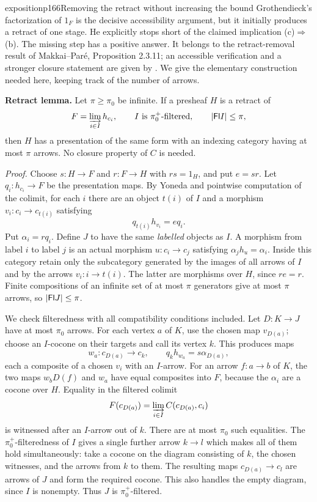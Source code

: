 \begin{dcomment}{exposition}{p166}{Removing the retract without increasing the bound}
Grothendieck's factorization of $1_F$ is the decisive accessibility argument, but it initially produces a retract of one stage. He explicitly stops short of the claimed implication (c)$\Rightarrow$(b). The missing step has a positive answer. It belongs to the retract-removal result of Makkai--Par\'e, Proposition 2.3.11; an accessible verification and a stronger closure statement are given by \citet[Corollaries 4.13 and 4.15, including footnote 2]{Chen2021Sifted}. We give the elementary construction needed here, keeping track of the number of arrows.

\textbf{Retract lemma.} Let $\pi\geq\pi_0$ be infinite. If a presheaf $H$ is a retract of
\[
 F=\varinjlim_{i\in I}h_{c_i},
 \qquad I\text{ is }\pi_0^+\text{-filtered},\qquad |\mathsf{Fl} I|\leq\pi,
\]
then $H$ has a presentation of the same form with an indexing category having at most $\pi$ arrows. No closure property of $C$ is needed.

\textit{Proof.} Choose $s:H\to F$ and $r:F\to H$ with $rs=1_H$, and put $e=sr$. Let $q_i:h_{c_i}\to F$ be the presentation maps. By Yoneda and pointwise computation of the colimit, for each $i$ there are an object $t(i)$ of $I$ and a morphism $v_i:c_i\to c_{t(i)}$ satisfying
\[
 q_{t(i)}h_{v_i}=e q_i.
\]
Put $\alpha_i=rq_i$. Define $J$ to have the same \emph{labelled} objects as $I$. A morphism from label $i$ to label $j$ is an actual morphism $u:c_i\to c_j$ satisfying $\alpha_jh_u=\alpha_i$. Inside this category retain only the subcategory generated by the images of all arrows of $I$ and by the arrows $v_i:i\to t(i)$. The latter are morphisms over $H$, since $re=r$. Finite compositions of an infinite set of at most $\pi$ generators give at most $\pi$ arrows, so $|\mathsf{Fl} J|\leq\pi$.

We check filteredness with all compatibility conditions included. Let $D:K\to J$ have at most $\pi_0$ arrows. For each vertex $a$ of $K$, use the chosen map $v_{D(a)}$; choose an $I$-cocone on their targets and call its vertex $k$. This produces maps
\[
 w_a:c_{D(a)}\longrightarrow c_k,
 \qquad q_kh_{w_a}=s\alpha_{D(a)},
\]
each a composite of a chosen $v_i$ with an $I$-arrow. For an arrow $f:a\to b$ of $K$, the two maps $w_bD(f)$ and $w_a$ have equal composites into $F$, because the $\alpha_i$ are a cocone over $H$. Equality in the filtered colimit
\[
 F(c_{D(a)})=\varinjlim_{i\in I}C(c_{D(a)},c_i)
\]
is witnessed after an $I$-arrow out of $k$. There are at most $\pi_0$ such equalities. The $\pi_0^+$-filteredness of $I$ gives a single further arrow $k\to l$ which makes all of them hold simultaneously: take a cocone on the diagram consisting of $k$, the chosen witnesses, and the arrows from $k$ to them. The resulting maps $c_{D(a)}\to c_l$ are arrows of $J$ and form the required cocone. This also handles the empty diagram, since $I$ is nonempty. Thus $J$ is $\pi_0^+$-filtered.


\end{dcomment}
